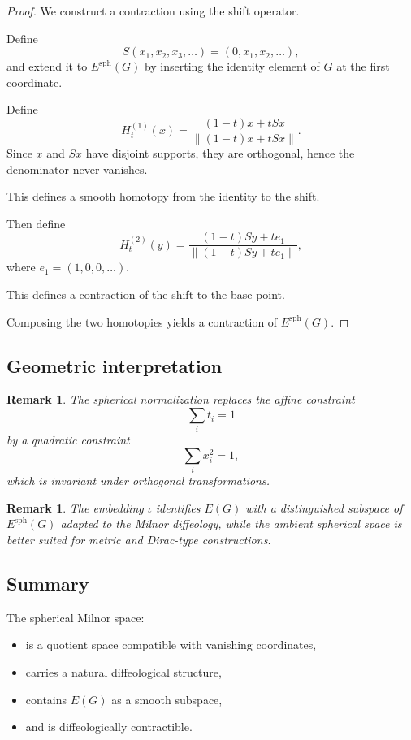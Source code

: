 \documentclass[11pt]{amsart}
\newtheorem{remark}[theorem]{Remark}
\begin{document}
\begin{proof}
We construct a contraction using the shift operator.

Define
\[
S(x_1,x_2,x_3,\dots) = (0,x_1,x_2,\dots),
\]
and extend it to $E^{\mathrm{sph}}(G)$ by inserting the identity element of $G$ at the first coordinate.

Define
\[
H_t^{(1)}(x) = \frac{(1-t)x + t Sx}{\|(1-t)x + t Sx\|}.
\]
Since $x$ and $Sx$ have disjoint supports, they are orthogonal, hence the denominator never vanishes.

This defines a smooth homotopy from the identity to the shift.

Then define
\[
H_t^{(2)}(y) = \frac{(1-t)Sy + t e_1}{\|(1-t)Sy + t e_1\|},
\]
where $e_1 = (1,0,0,\dots)$.

This defines a contraction of the shift to the base point.

Composing the two homotopies yields a contraction of $E^{\mathrm{sph}}(G)$.
\end{proof}

\subsection{Geometric interpretation}

\begin{remark}
The spherical normalization replaces the affine constraint
\[
\sum_i t_i = 1
\]
by a quadratic constraint
\[
\sum_i x_i^2 = 1,
\]
which is invariant under orthogonal transformations.
\end{remark}

\begin{remark}
The embedding $\iota$ identifies $E(G)$ with a distinguished subspace of $E^{\mathrm{sph}}(G)$ adapted to the Milnor diffeology, while the ambient spherical space is better suited for metric and Dirac-type constructions.
\end{remark}

\subsection{Summary}

The spherical Milnor space:
\begin{itemize}
\item is a quotient space compatible with vanishing coordinates,
\item carries a natural diffeological structure,
\item contains $E(G)$ as a smooth subspace,
\item and is diffeologically contractible.
\end{itemize}
\end{document}
